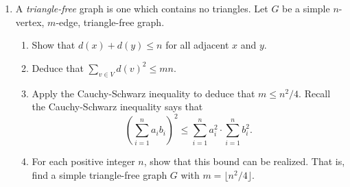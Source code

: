 \documentclass[11pt,letterpaper]{report}
\begin{document}
\begin{enumerate}
	\item A \textit{triangle-free} graph is one which contains no triangles. Let $G$ be a simple $n$-vertex, $m$-edge, triangle-free graph.
	\begin{enumerate}
		\item Show that $d(x) + d(y) \leq n$ for all adjacent $x$ and $y$.
		\item Deduce that $\sum_{v\in V}d(v)^2 \leq mn$.
		\item Apply the Cauchy-Schwarz inequality to deduce that $m\leq n^2/4$. Recall the Cauchy-Schwarz inequality says that
		\[
		\left(\sum_{i=1}^n a_ib_i\right)^2\leq \sum_{i=1}^na_i^2\cdot \sum_{i=1}^nb_i^2.
		\]
		\item For each positive integer $n$, show that this bound can be realized. That is, find a simple triangle-free graph $G$ with $m = \lfloor n^2/4\rfloor$.
	\end{enumerate}
	\vfill
\end{enumerate}
\end{document}
